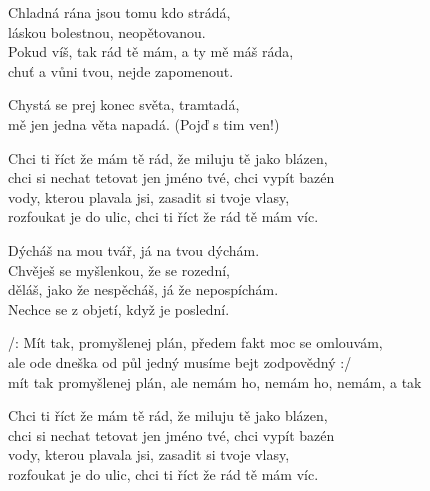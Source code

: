 
\ve{}
Chladná rána jsou tomu kdo strádá,\\
láskou bolestnou, neopětovanou.\\
Pokud víš, tak rád tě mám, a ty mě máš ráda,\\
chuť a vůni tvou, nejde zapomenout.

\cho{}
Chystá se prej konec světa, tramtadá,\\
mě jen jedna věta napadá. (Pojď s tim ven!)

Chci ti říct že mám tě rád, že miluju tě jako blázen,\\
chci si nechat tetovat jen jméno tvé, chci vypít bazén \\
vody, kterou plavala jsi, zasadit si tvoje vlasy,\\
rozfoukat je do ulic, chci ti říct že rád tě mám víc.

\ve{}
Dýcháš na mou tvář, já na tvou dýchám.\\
Chvěješ se myšlenkou, že se rozední,\\
děláš, jako že nespěcháš, já že nepospíchám.\\
Nechce se z objetí, když je poslední.

\cho{}

\re{*:}
/: Mít tak, promyšlenej plán, předem fakt moc se omlouvám,\\
ale ode dneška od půl jedný musíme bejt zodpovědný :/\\
mít tak promyšlenej plán, ale nemám ho, nemám ho, nemám, a tak

\cho{}
Chci ti říct že mám tě rád, že miluju tě jako blázen,\\
chci si nechat tetovat jen jméno tvé, chci vypít bazén \\
vody, kterou plavala jsi, zasadit si tvoje vlasy,\\
rozfoukat je do ulic, chci ti říct že rád tě mám víc.

\esong{}